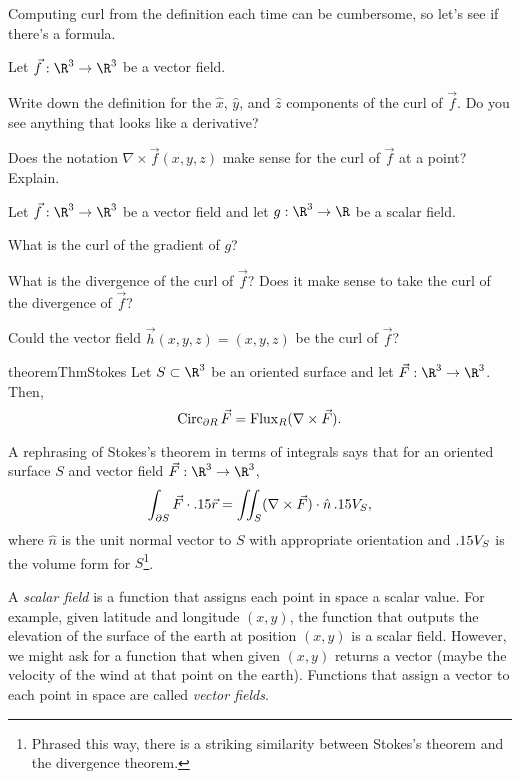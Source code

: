 	Computing curl from the definition each time can be cumbersome, so let's see
	if there's a formula.
	
\begin{question}
	Let $\vec f:\R^3\to\R^3$ be a vector field.
	\begin{parts}
		\item Write down the definition
			for the $\hat x$, $\hat y$, and $\hat z$ components of the curl of $\vec f$.
			Do you see anything that looks like a derivative?
		\item Does the notation $\nabla \times \vec f(x,y,z)$ make sense for the curl of
			$\vec f$ at a point?  Explain.
	\end{parts}
\end{question}

\begin{question}
	Let $\vec f:\R^3\to\R^3$ be a vector field and let $g:\R^3\to \R$ be a scalar field.
	\begin{parts}
		\item What is the curl of the gradient of $g$?
		\item What is the divergence of the curl of $\vec f$?  Does it
			make sense to take the curl of the divergence of $\vec f$?
		\item Could the vector field $\vec h(x,y,z) = (x,y,z)$ be the curl
			of $\vec f$?
	\end{parts}
\end{question}


\begin{restatable*}{theorem}{ThmStokes}
	Let $S\subset \R^3$ be an oriented surface and let $\vec F:\R^3\to\R^3$.  Then,
	\[
		\operatorname{Circ}_{\partial R} \vec F = \operatorname{Flux}_{R}(\nabla \times \vec F).
	\]
\end{restatable*}
A rephrasing of Stokes's theorem in terms of integrals says that for an oriented
surface $S$ and vector field $\vec F:\R^3\to\R^3$,
\[
	\int_{\partial S} \vec F\cdot .15\vec r = \iint_S (\nabla \times \vec F)\cdot
	\hat n\,.15 V_S,
\]
where $\hat n$ is the unit normal vector to $S$ with appropriate orientation and 
$.15 V_S$ is the volume form for $S$\footnote{ Phrased this way, there is a striking similarity
between Stokes's theorem and the divergence theorem.}.  




\newpage
A \emph{scalar field}
is a function that assigns each point in space a
scalar value.  For example, given latitude and longitude $(x,y)$,
the function that outputs the elevation of the surface of the earth
at position $(x,y)$ is a scalar field.  However,
we might ask for a function that when given $(x,y)$ returns
a vector (maybe the velocity of the wind at that point on the earth).
Functions that assign a vector to each point in space
are called \emph{vector fields}.

